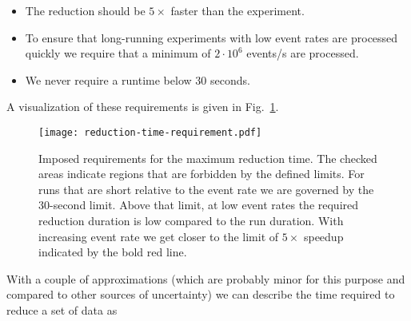 \documentclass[a4paper,english,numbers=noenddot,bibliography=totoc,chapterprefix=on,DIV=12]{scrartcl}
\begin{document}
\begin{itemize}
  \item The reduction should be $5\times$ faster than the experiment.
  \item To ensure that long-running experiments with low event rates are processed quickly we require that a minimum of $2\cdot10^6$ events/s are processed.
  \item We never require a runtime below 30 seconds.
\end{itemize}
A visualization of these requirements is given in Fig.~\ref{fig:reduction-time-requirement}.

\begin{figure}
  \centering
\texttt{[image: reduction-time-requirement.pdf]}
\caption{\label{fig:reduction-time-requirement}Imposed requirements for the maximum reduction time. The checked areas indicate regions that are forbidden by the defined limits. For runs that are short relative to the event rate we are governed by the 30-second limit. Above that limit, at low event rates the required reduction duration is low compared to the run duration. With increasing event rate we get closer to the limit of $5\times$ speedup indicated by the bold red line.}
\end{figure}

With a couple of approximations (which are probably minor for this purpose and compared to other sources of uncertainty) we can describe the time required to reduce a set of data as
\end{document}
